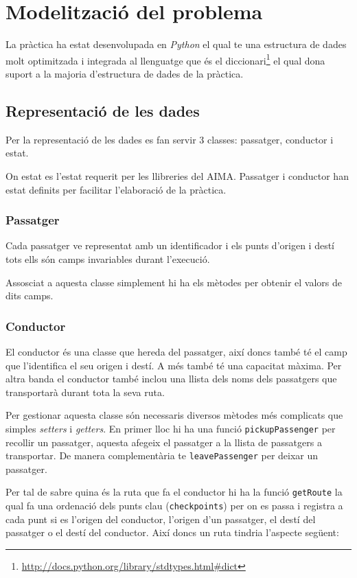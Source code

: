 \section{Modelització del problema}
La pràctica ha estat desenvolupada en \emph{Python} el qual te una estructura de dades molt optimitzada
i integrada al llenguatge que és el diccionari\footnote{\url{http://docs.python.org/library/stdtypes.html\#dict}}
el qual dona suport a la majoria d'estructura de dades de la pràctica.

\subsection{Representació de les dades}
Per la representació de les dades es fan servir 3 classes: passatger, conductor i estat.

On estat es l'estat requerit per les llibreries del AIMA. Passatger i conductor han estat
definits per facilitar l'elaboració de la pràctica.

\subsubsection{Passatger}
Cada passatger ve representat amb un identificador i els punts d'origen i destí tots ells són
camps invariables durant l'execució.

Assosciat a aquesta classe simplement hi ha els mètodes per obtenir el valors de dits camps.

\subsubsection{Conductor}
El conductor és una classe que hereda del passatger, així doncs també té el camp que l'identifica
el seu origen i destí. A més també té una capacitat màxima.
Per altra banda el conductor també inclou una llista dels noms dels passatgers que transportarà
durant tota la seva ruta.

Per gestionar aquesta classe són necessaris diversos mètodes més complicats que simples \emph{setters} i \emph{getters}.
En primer lloc hi ha una funció \texttt{pickupPassenger} per recollir un passatger, aquesta afegeix el passatger
a la llista de passatgers a transportar. De manera complementària te \texttt{leavePassenger} per deixar un 
passatger.

Per tal de sabre quina és la ruta que fa el conductor hi ha la funció \texttt{getRoute} la qual
fa una ordenació dels punts clau (\texttt{checkpoints}) per on es passa i registra a cada punt si es
l'origen del conductor, l'origen d'un passatger, el destí del passatger o el destí del conductor. Així
doncs un ruta tindria l'aspecte següent: 

